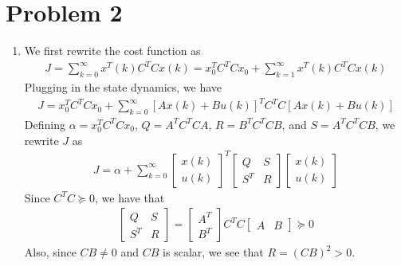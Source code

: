 \section*{Problem 2}

\begin{enumerate}
    \item
    We first rewrite the cost function as
    \begin{align*}
        J = \sum_{k=0}^\infty x^T(k) C^T Cx(k) = x_0^T C^T Cx_0 + \sum_{k=1}^\infty x^T(k) C^T Cx(k)
    \end{align*}
    Plugging in the state dynamics, we have
    \begin{align*}
        J = x_0^T C^T Cx_0 + \sum_{k=0}^\infty [Ax(k) + Bu(k)]^T C^T C [Ax(k) + Bu(k)]
    \end{align*}
    Defining $\alpha = x_0^T C^T C x_0$, $Q = A^T C^T CA$, $R = B^T C^T CB$, and $S = A^T C^T CB$, we rewrite $J$ as
    \begin{align}
        J = \alpha + \sum_{k=0}^\infty \begin{bmatrix}
                x(k) \\
                u(k)
            \end{bmatrix}^T \begin{bmatrix}
                Q & S \\
                S^T & R
            \end{bmatrix} \begin{bmatrix}
                x(k) \\
                u(k)
            \end{bmatrix}
            \label{eq:mid2p2_cost}
    \end{align}
    Since $C^T C \succeq 0$, we have that
    \begin{align*}
        \begin{bmatrix}
                Q & S \\
                S^T & R
            \end{bmatrix} = \begin{bmatrix}
                A^T \\
                B^T
            \end{bmatrix} C^T C \begin{bmatrix}
                A & B
            \end{bmatrix} \succeq 0
    \end{align*}
    Also, since $CB \neq 0$ and $CB$ is scalar, we see that $R = (CB)^2 > 0$.


\end{enumerate}
